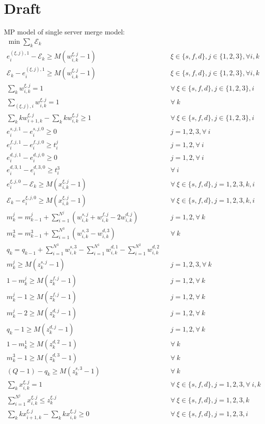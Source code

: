 \documentclass[]{interact}
\theoremstyle{plain}%
\theoremstyle{definition}
\theoremstyle{remark}
\begin{document}
\section{Draft}
MP model of single server merge model:
\begin{eqnarray}
\min{\sum_{k}\mathcal{E}_k}\\
e^{(\xi,j),1}_i - \mathcal{E}_{k}\ge M(w^{\xi,j}_{i,k}-1)&&\xi\in\{s,f,d\}, j\in\{1,2,3\},\forall i,k \\
\mathcal{E}_{k} - e^{(\xi,j),1}_i\ge M(w^{\xi,j}_{i,k}-1)&&\xi\in\{s,f,d\}, j\in\{1,2,3\},\forall i,k \\
\sum_{k} w^{\xi,j}_{i,k} =1&& \forall\ \xi\in\{s,f,d\}, j\in\{1,2,3\},i\\
\sum_{(\xi,j),i} w^{\xi,j}_{i,k} =1&& \forall\ k\\
\sum_{k} kw^{\xi,j}_{i+1,k} - \sum_{k} kw^{\xi,j}_{i,k} \ge 1&& \forall\  \xi\in\{s,f,d\}, j\in\{1,2,3\},i\\
e^{s,j,1}_{i} - e^{s,j,0}_{i} \ge 0 && j =1,2,3, \forall \ i\\
e^{f,j,1}_{i} - e^{f,j,0}_{i} \ge t^j_{i}&& j =1,2, \forall \ i\\
e^{d,j,1}_{i} - e^{d,j,0}_{i} \ge 0 && j =1,2, \forall \ i\\
e^{d,3,1}_{i} - e^{d,3,0}_{i} \ge t^3_{i}&&\forall \ i \\
e^{\xi,j,0}_i-\mathcal{E}_{k} \ge M(x^{\xi,j}_{i,k}-1)&& \forall\ \xi\in\{s,f,d\},j=1,2,3,k,i\\
\mathcal{E}_{k} -e^{\xi,j,0}_i\ge M(x^{\xi,j}_{i,k}-1)&& \forall\ \xi\in\{s,f,d\},j=1,2,3,k,i\\
m^j_k=m^j_{k-1} + \sum_{i=1}^{N^{j}} (w^{s,j}_{i,k}  + w^{f,j}_{i,k} - 2w^{d,j}_{i,k})&& j=1,2, \forall\ k\\
m^3_k=m^3_{k-1} + \sum_{i=1}^{N^{3}} (w^{s,3}_{i,k} - w^{d,3}_{i,k})&&\forall\ k\\
q_k = q_{k-1} + \sum_{i=1}^{N^{3}} w^{s,3}_{i,k} - \sum_{i=1}^{N^{1}} w^{d,1}_{i,k} - \sum_{i=1}^{N^{2}} w^{d,2}_{i,k}\\
m^j_k \ge M(z^{s,j}_{k}-1)&& j=1,2,3, \forall \ k\\
1- m^j_k \ge M(z^{f,j}_{k}-1)&& j=1,2, \forall \ k\\
m^j_k - 1 \ge M(z^{f,j}_{k}-1)&& j=1,2, \forall \ k\\
m^j_k - 2 \ge M(z^{d,j}_{k}-1)&& j=1,2, \forall \ k\\
q_k - 1 \ge M(z^{d,j}_{k}-1)&&  j=1,2, \forall \ k\\
1 - m^1_k \ge M(z^{d,2}_{k}-1)&& \forall\ k\\
m^3_k - 1 \ge M(z^{d,3}_{k}-1)&& \forall \ k\\
(Q-1) - q_k \ge M(z^{s,3}_{k}-1)&& \forall\ k\\
\sum_{k} x^{\xi,j}_{i,k} =1&& \forall\ \xi\in\{s,f,d\}, j=1,2,3, \forall\ i,k\\
\sum_{i=1}^{N^{j}}x^{\xi,j}_{i,k} \le z^{\xi,j}_{k}&& \forall\ \xi\in\{s,f,d\}, j=1,2,3, k\\
\sum_{k} kx^{\xi,j}_{i+1,k} - \sum_{k} kx^{\xi,j}_{i,k} \ge 0 && \forall\ \xi\in\{s,f,d\}, j=1,2,3, i
\end{eqnarray}
\end{document}
